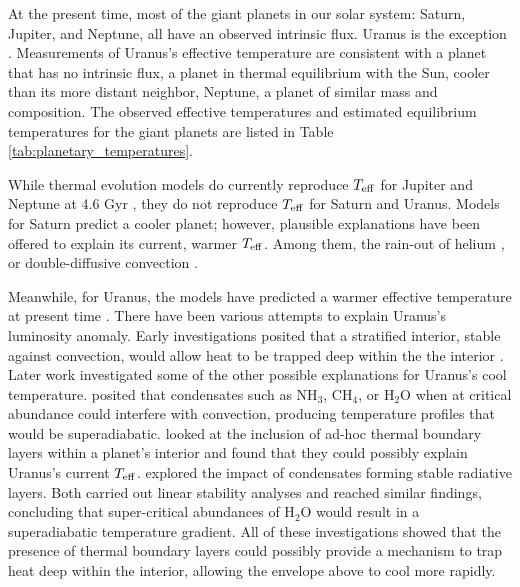 \documentclass[11pt]{ucscthesisbs}
\begin{document}
At the present time, most of the giant planets in our solar system: Saturn, Jupiter, and Neptune, all have an observed intrinsic flux. Uranus is the exception \citep{pearl_conrath_1991}. Measurements of Uranus's effective temperature are consistent with a planet that has no intrinsic flux, a planet in thermal equilibrium with the Sun, cooler than its more distant neighbor, Neptune, a planet of similar mass and composition. The observed effective temperatures and estimated equilibrium temperatures for the giant planets are listed in Table \ref{tab:planetary_temperatures}. 

While thermal evolution models do currently reproduce $T_{\rm eff}$ for Jupiter and Neptune at 4.6 Gyr \citep{graboske_1975,fortney_2011}, they do not reproduce $T_{\rm eff}$ for Saturn and Uranus. Models for Saturn predict a cooler planet; however, plausible explanations have been offered to explain its current, warmer $T_{\rm eff}$. Among them, the rain-out of helium \citep{fortney_hubbard_2003, mankovich_2020}, or double-diffusive convection \citep{leconte_chabrier_2013}. 

Meanwhile, for Uranus, the models have predicted a warmer effective temperature at present time \citep{fortney_2011, podolak_1991, hubbard_1995, scheibe_2019}. There have been various attempts to explain Uranus's luminosity anomaly. Early investigations posited that a stratified interior, stable against convection, would allow heat to be trapped deep within the the interior \citep{podolak_1991}. Later work investigated some of the other possible explanations for Uranus's cool temperature. \citep{guillot_1995} posited that condensates such as NH$_{3}$, CH$_{4}$, or H$_{2}$O when at critical abundance could interfere with convection, producing temperature profiles that would be superadiabatic. \citep{nettelmann_2016} looked at the inclusion of ad-hoc thermal boundary layers within a planet's interior and found that they could possibly explain Uranus's current $T_{\rm eff}$. \citep{friedson_2017,leconte_2017} explored the impact of condensates forming stable radiative layers. Both carried out linear stability analyses and reached similar findings, concluding that super-critical abundances of H$_{2}$O would result in a superadiabatic temperature gradient. All of these investigations showed that the presence of thermal boundary layers could possibly provide a mechanism to trap heat deep within the interior, allowing the envelope above to cool more rapidly.
\end{document}
